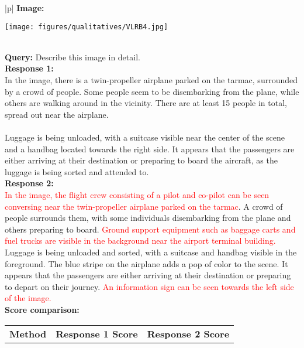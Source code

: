 \begin{table*}[hbtp]
    \begin{center}
        \begin{tabular}{|p{\textwidth}|}
        \hline
        \textbf{Image:}
        \begin{center}
            \texttt{[image: figures/qualitatives/VLRB4.jpg]}
        \end{center} \\
        \hline
        \textbf{Query:} Describe this image in detail. \\
        \hline
        \textbf{Response 1:} \\
        In the image, there is a twin-propeller airplane parked on the tarmac, surrounded by a crowd of people. Some people seem to be disembarking from the plane, while others are walking around in the vicinity. There are at least 15 people in total, spread out near the airplane.\\ \\
        Luggage is being unloaded, with a suitcase visible near the center of the scene and a handbag located towards the right side. It appears that the passengers are either arriving at their destination or preparing to board the aircraft, as the luggage is being sorted and attended to.\\
        \hline
        \textbf{Response 2:} \\
        \textcolor{Red}{In the image, the flight crew consisting of a pilot and co-pilot can be seen conversing near the twin-propeller airplane parked on the tarmac}. A crowd of people surrounds them, with some individuals disembarking from the plane and others preparing to board. \textcolor{Red}{Ground support equipment such as baggage carts and fuel trucks are visible in the background near the airport terminal building.} Luggage is being unloaded and sorted, with a suitcase and handbag visible in the foreground. The blue stripe on the airplane adds a pop of color to the scene. It appears that the passengers are either arriving at their destination or preparing to depart on their journey. \textcolor{Red}{An information sign can be seen towards the left side of the image.}\\
        \hline
        \textbf{Score comparison:}
        \begin{center}
            \begin{tabular}{|l|c|c|}
                \hline
                \textbf{Method} & \textbf{Response 1 Score} & \textbf{Response 2 Score} \\

\end{tabular}
\end{center}
\end{tabular}
\end{center}
\end{table*}

